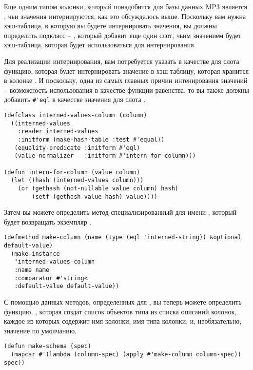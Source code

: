 Еще одним типом колонки, который понадобится для базы данных MP3 является
, чьи значения интернируются, как это обсуждалось выше.  Поскольку
вам нужна хэш-таблица, в которую вы будете интернировать значения, вы должны определить
подкласс  -- , который добавит еще один слот,
чьим значением будет хэш-таблица, которая будет использоваться для интернирования.

Для реализации интернирования, вам потребуется указать в качестве  для
слота  функцию, которая будет интернировать значение в хэш-таблицу,
которая хранится в колонке .  И поскольку, одна из самых главных
причин интенирования значений -- возможность использования  в качестве функции
равенства, то вы также должны добавить \lstinline!#'eql! в качестве значения 
для слота .

\begin{lstlisting}
(defclass interned-values-column (column)
  ((interned-values
    :reader interned-values
    :initform (make-hash-table :test #'equal))
   (equality-predicate :initform #'eql)
   (value-normalizer   :initform #'intern-for-column)))

(defun intern-for-column (value column)
  (let ((hash (interned-values column)))
    (or (gethash (not-nullable value column) hash)
        (setf (gethash value hash) value))))
\end{lstlisting}

Затем вы можете определить метод  специализированный для имени
, который будет возвращать экземпляр .

\begin{lstlisting}
(defmethod make-column (name (type (eql 'interned-string)) &optional default-value)
  (make-instance 
   'interned-values-column
   :name name
   :comparator #'string< 
   :default-value default-value))
\end{lstlisting}

С помощью данных методов, определенных для , вы теперь можете определить
функцию, , которая создат список объектов типа  из списка
описаний колонок, каждое из которых содержит имя колонки, имя типа колонки, и,
необязательно, значение по умолчанию.

\begin{lstlisting}
(defun make-schema (spec)
  (mapcar #'(lambda (column-spec) (apply #'make-column column-spec)) spec))
\end{lstlisting}

